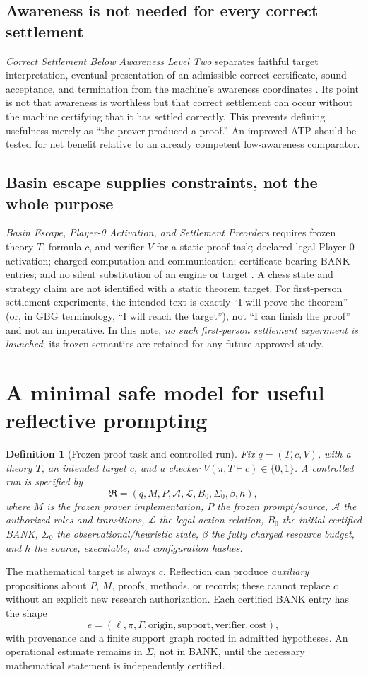\documentclass[11pt,letterpaper]{article}
\newtheorem{definition}{Definition}[section]
\begin{document}
\subsection{Awareness is not needed for every correct settlement}
\emph{Correct Settlement Below Awareness Level Two} separates faithful target interpretation, eventual presentation of an admissible correct certificate, sound acceptance, and termination from the machine's awareness coordinates \cite{lowaware}. Its point is not that awareness is worthless but that correct settlement can occur without the machine certifying that it has settled correctly. This prevents defining usefulness merely as ``the prover produced a proof.'' An improved ATP should be tested for net benefit relative to an already competent low-awareness comparator.

\subsection{Basin escape supplies constraints, not the whole purpose}
\emph{Basin Escape, Player-0 Activation, and Settlement Preorders} requires frozen theory $T$, formula $c$, and verifier $V$ for a static proof task; declared legal Player-0 activation; charged computation and communication; certificate-bearing BANK entries; and no silent substitution of an engine or target \cite{basin}. A chess state and strategy claim are not identified with a static theorem target. For first-person settlement experiments, the intended text is exactly ``I will prove the theorem'' (or, in GBG terminology, ``I will reach the target''), not ``I can finish the proof'' and not an imperative. In this note, \emph{no such first-person settlement experiment is launched}; its frozen semantics are retained for any future approved study.

\section{A minimal safe model for useful reflective prompting}
\begin{definition}[Frozen proof task and controlled run]
Fix $q=(T,c,V)$, with a theory $T$, an intended target $c$, and a checker $V(\pi,T\vdash c)\in\{0,1\}$. A controlled run is specified by
\[
\mathfrak R=(q,M,P,\mathcal A,\mathcal L,B_0,\Sigma_0,\beta,h),
\]
where $M$ is the frozen prover implementation, $P$ the frozen prompt/source, $\mathcal A$ the authorized roles and transitions, $\mathcal L$ the legal action relation, $B_0$ the initial certified BANK, $\Sigma_0$ the observational/heuristic state, $\beta$ the fully charged resource budget, and $h$ the source, executable, and configuration hashes.
\end{definition}
The mathematical target is always $c$. Reflection can produce \emph{auxiliary} propositions about $P$, $M$, proofs, methods, or records; these cannot replace $c$ without an explicit new research authorization. Each certified BANK entry has the shape
\[
e=(\ell,\pi,\Gamma,\text{origin},\text{support},\text{verifier},\text{cost}),
\]
with provenance and a finite support graph rooted in admitted hypotheses. An operational estimate remains in $\Sigma$, not in BANK, until the necessary mathematical statement is independently certified.
\end{document}
